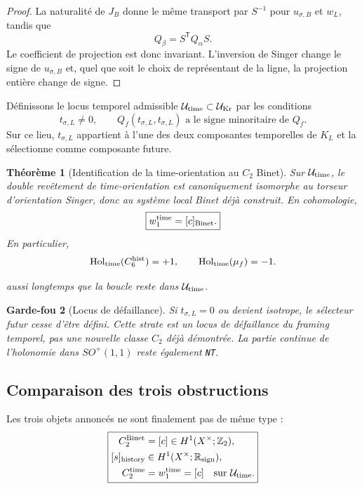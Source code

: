 \documentclass[11pt,a4paper]{article}
\newtheorem{theorem}{Théorème}[section]
\newtheorem{guardrail}[theorem]{Garde-fou}
\newcommand{\certNT}{\texttt{NT}}
\begin{document}
\begin{proof}
La naturalité de $J_B$ donne le même transport par $S^{-1}$ pour $u_{\sigma,B}$ et $w_L$, tandis que
\[
 Q_\beta=S^{\mathsf T}Q_\alpha S.
\]
Le coefficient de projection est donc invariant. L'inversion de Singer change le signe de $u_{\sigma,B}$ et, quel que soit le choix de représentant de la ligne, la projection entière change de signe.
\end{proof}

Définissons le locus temporel admissible $\mathcal U_{\rm time}\subset\mathcal U_{\rm Kr}$ par les conditions
\[
 t_{\sigma,L}\ne0,
 \qquad
 Q_f(t_{\sigma,L},t_{\sigma,L})
 \text{ a le signe minoritaire de }Q_f.
\]
Sur ce lieu, $t_{\sigma,L}$ appartient à l'une des deux composantes temporelles de $K_L$ et la sélectionne comme composante future.

\begin{theorem}[Identification de la time-orientation au $C_2$ Binet]\label{thm:v27-time-equals-Binet}
Sur $\mathcal U_{\rm time}$, le double revêtement de time-orientation est canoniquement isomorphe au torseur d'orientation Singer, donc au système local Binet déjà construit. En cohomologie,
\begin{equation}\label{eq:v27-time-class}
 \boxed{
 w_1^{\rm time}
 =
 [c]_{\rm Binet}.}
\end{equation}
En particulier,
\[
 \operatorname{Hol}_{\rm time}(C_6^{\rm hist})=+1,
 \qquad
 \operatorname{Hol}_{\rm time}(\mu_f)=-1.
\]

aussi longtemps que la boucle reste dans $\mathcal U_{\rm time}$.
\end{theorem}

\begin{guardrail}[Locus de défaillance]
Si $t_{\sigma,L}=0$ ou devient isotrope, le sélecteur futur cesse d'être défini. Cette strate est un locus de défaillance du framing temporel, pas une nouvelle classe $C_2$ déjà démontrée. La partie continue de l'holonomie dans $SO^+(1,1)$ reste également \certNT{}.
\end{guardrail}

\subsection{Comparaison des trois obstructions}

Les trois objets annoncés ne sont finalement pas de même type :
\begin{equation}\label{eq:v27-three-obstructions}
 \boxed{
 \begin{aligned}
 C_2^{\rm Binet}&=[c]\in H^1(X^\times;\mathbb Z_2),\\
 [s]_{\rm history}&\in H^1(X^\times;\mathbb R_{\rm sign}),\\
 C_2^{\rm time}&=w_1^{\rm time}=[c]\quad\text{sur }\mathcal U_{\rm time}.
 \end{aligned}}
\end{equation}
\end{document}
